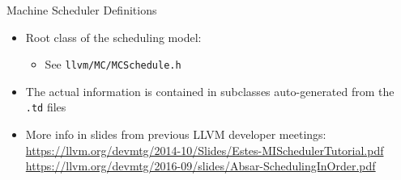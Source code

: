 \begin{frame}{Machine Scheduler Definitions}
\begin{itemize}
\item Root class of the scheduling model: 
	\begin{itemize}
	\item See \texttt{llvm/MC/MCSchedule.h}
	\end{itemize}
\item The actual information is contained in 
	subclasses auto-generated from the \texttt{.td} files

\medskip
\item More info in slides from previous LLVM developer meetings: \\\smallskip
\url{https://llvm.org/devmtg/2014-10/Slides/Estes-MISchedulerTutorial.pdf}\\\smallskip
\url{https://llvm.org/devmtg/2016-09/slides/Absar-SchedulingInOrder.pdf}
\end{itemize}
\end{frame}

